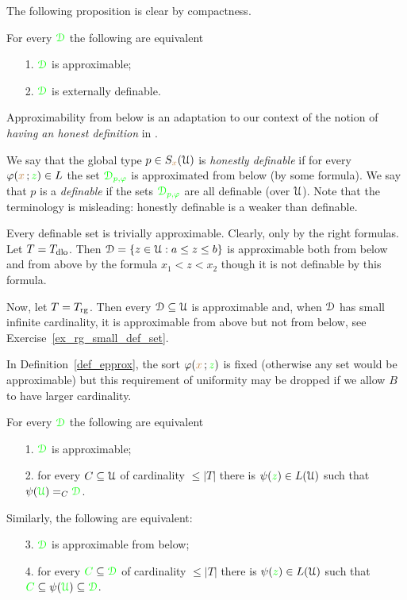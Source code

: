 \documentclass[creche.tex]{subfiles}
\begin{document}
The following proposition is clear by compactness.

\begin{proposition}\label{lem_approx=external}
For every ${\color{green}\EuScript D}$ the following are equivalent
\begin{itemize}
\item[1.] ${\color{green}\EuScript D}$ is approximable;
\item[2.] ${\color{green}\EuScript D}$ is externally definable.\QED 
\end{itemize}
\end{proposition}

Approximability from below is an adaptation to our context of the notion of \textit{having an honest definition} in \cite{CS}.
\begin{definition}
We say that the global type $p\in S_{{\color{brown} x}}(\EuScript U)$ is \emph{honestly definable\/} if for every $\varphi({\color{brown} x}\,;{\color{green} z})\in L$ the set ${\color{green}\EuScript D_{p,\varphi}}$ is approximated from below (by some formula). We say that $p$ is a \emph{definable\/} if the sets ${\color{green}\EuScript D_{p,\varphi}}$ are all definable (over $\EuScript U$). Note that the terminology is misleading: honestly definable is a weaker than definable.
\end{definition}



\begin{example}
Every definable set is trivially approximable.
Clearly, only by the right formulas.
Let $T=T_{\rm dlo}$.
Then $\EuScript D=\{z\in\EuScript U:a\le z\le b\}$ is approximable both from below and from above by the formula $x_1<z<x_2$ though it is not definable by this formula.

Now, let $T=T_{\rm rg}$.
Then every $\EuScript D\subseteq\EuScript U$ is approximable and, when $\EuScript D$ has small infinite cardinality, it is approximable from above but not from below, see Exercise~\ref{ex_rg_small_def_set}.\QED
\end{example}

In Definition~\ref{def_epprox}, the sort $\varphi({\color{brown} x}\,;{\color{green} z})$ is fixed (otherwise any set would be approximable) but this requirement of uniformity may be dropped if we allow $B$ to have larger cardinality.

\begin{proposition}\label{lem_approx_nonunif}
For every ${\color{green}\EuScript D}$ the following are equivalent
\begin{itemize}
\item[1.] ${\color{green}\EuScript D}$ is approximable;
\item[2.] for every $C\subseteq\EuScript U$ of cardinality $\le|T|$ there is $\psi({\color{green} z})\in L(\EuScript U)$ such that $\psi({\color{green}\EuScript U})=_C{\color{green}\EuScript D}$.
\end{itemize}
Similarly, the following are equivalent:
\begin{itemize}
\item[3.] ${\color{green}\EuScript D}$ is approximable from below;
\item[4.]  for every ${\color{green} C}\subseteq{\color{green}\EuScript D}$ of cardinality $\le|T|$ there is $\psi({\color{green} z})\in L(\EuScript U)$ such that ${\color{green} C}\subseteq \psi({\color{green}\EuScript U})\subseteq{\color{green}\EuScript D}$.
\end{itemize}
\end{proposition}
\end{document}
